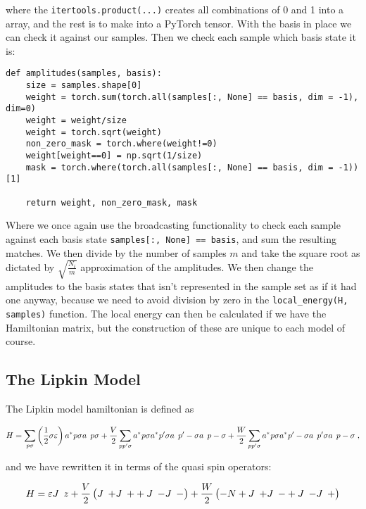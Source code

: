where the \texttt{itertools.product(...)} creates all combinations of 0 and 1 into a array, and the rest is to make into a PyTorch tensor. With the basis in place we can check it against our samples. Then we check each sample which basis state it is:

\begin{verbatim}
def amplitudes(samples, basis):
    size = samples.shape[0]
    weight = torch.sum(torch.all(samples[:, None] == basis, dim = -1), dim=0)
    weight = weight/size
    weight = torch.sqrt(weight)
    non_zero_mask = torch.where(weight!=0)
    weight[weight==0] = np.sqrt(1/size)
    mask = torch.where(torch.all(samples[:, None] == basis, dim = -1))[1]

    return weight, non_zero_mask, mask
\end{verbatim}

Where we once again use the broadcasting functionality to check each sample against each basis state \texttt{samples[:, None] == basis}, and sum the resulting matches. We then divide by the number of samples $m$ and take the square root as dictated by $\sqrt{\frac{N_i}{m}}$ approximation of the amplitudes. We then change the amplitudes to the basis states that isn't represented in the sample set as if it had one anyway, because we need to avoid division by zero in the \texttt{local_energy(H, samples)} function. The local energy can then be calculated if we have the Hamiltonian matrix, but the construction of these are unique to each model of course.

\subsection{The Lipkin Model}


The Lipkin model hamiltonian is defined as

\begin{equation} 
    H = \sum_{p\sigma} \left ( \frac{1}{2} \sigma \varepsilon \right ) \hc{a}{p\sigma}\op{a}{p\sigma} + \frac{V}{2}\sum_{pp'\sigma} \hc{a}{p\sigma} \hc{a}{p'\sigma} \op{a}{p'-\sigma}\op{a}{p-\sigma} + \frac{W}{2} \sum_{pp'\sigma} \hc{a}{p\sigma} \hc{a}{p'-\sigma} \op{a}{p'\sigma}\op{a}{p-\sigma} \; , 
\end{equation}

and we have rewritten it in terms of the quasi spin operators:

$$H = \varepsilon \op{J}{z} + \frac{V}{2} \left ( \op{J}{+}\op{J}{+}  + \op{J}{-}\op{J}{-} \right ) + \frac{W}{2} \left ( -N + \op{J}{+} \op{J}{-} + \op{J}{-}\op{J}{+} \right )$$

